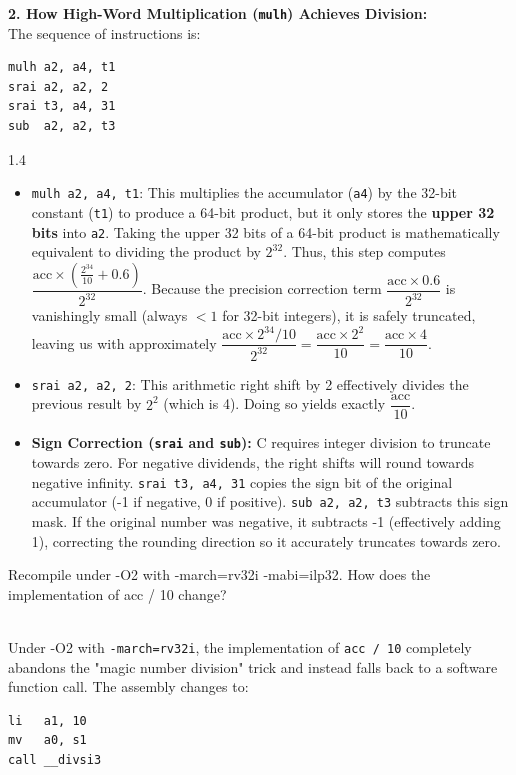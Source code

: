 \documentclass[12pt, a4paper]{article}
\begin{document}
\noindent
\textbf{2. How High-Word Multiplication (\texttt{mulh}) Achieves Division:}\\
The sequence of instructions is:
\begin{verbatim}
mulh a2, a4, t1
srai a2, a2, 2
srai t3, a4, 31
sub  a2, a2, t3
\end{verbatim}
\begin{spacing}{1.4}
\begin{itemize}[leftmargin=*]
    \item \texttt{mulh a2, a4, t1}: This multiplies the accumulator (\texttt{a4}) by the 32-bit constant (\texttt{t1}) to produce a 64-bit product, but it only stores the \textbf{upper 32 bits} into \texttt{a2}. Taking the upper 32 bits of a 64-bit product is mathematically equivalent to dividing the product by $2^{32}$. Thus, this step computes $\dfrac{\text{acc} \times (\frac{2^{34}}{10} + 0.6)}{2^{32}}$. Because the precision correction term $\dfrac{\text{acc} \times 0.6}{2^{32}}$ is vanishingly small (always $< 1$ for 32-bit integers), it is safely truncated, leaving us with approximately $\dfrac{\text{acc} \times 2^{34}/10}{2^{32}} = \dfrac{\text{acc} \times 2^2}{10} = \dfrac{\text{acc} \times 4}{10}$.
    \item \texttt{srai a2, a2, 2}: This arithmetic right shift by 2 effectively divides the previous result by $2^2$ (which is 4). Doing so yields exactly $\dfrac{\text{acc}}{10}$.
    \item \textbf{Sign Correction (\texttt{srai} and \texttt{sub}):} C requires integer division to truncate towards zero. For negative dividends, the right shifts will round towards negative infinity. \texttt{srai t3, a4, 31} copies the sign bit of the original accumulator (-1 if negative, 0 if positive). \texttt{sub a2, a2, t3} subtracts this sign mask. If the original number was negative, it subtracts -1 (effectively adding 1), correcting the rounding direction so it accurately truncates towards zero.
\end{itemize}
\end{spacing}

\noindent\hrulefill

\vspace{0.3cm}
\noindent
Recompile under -O2 with -march=rv32i -mabi=ilp32. How does the implementation of acc / 10 change?

\vspace{0.3cm}
\noindent{}\\
Under -O2 with \texttt{-march=rv32i}, the implementation of \texttt{acc / 10} completely abandons the "magic number division" trick and instead falls back to a software function call. The assembly changes to:
\begin{verbatim}
li   a1, 10
mv   a0, s1
call __divsi3
\end{verbatim}
\end{document}
